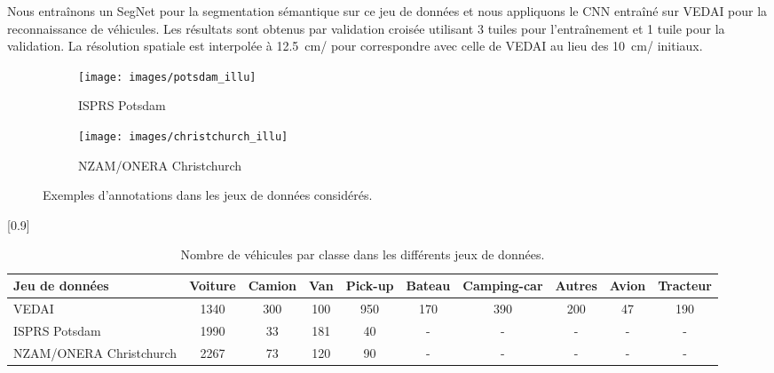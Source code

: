 Nous entraînons un SegNet pour la segmentation sémantique sur ce jeu de données et nous appliquons le \gls{CNN} entraîné sur \gls{VEDAI} pour la reconnaissance de véhicules. Les résultats sont obtenus par validation croisée utilisant 3 tuiles pour l'entraînement et 1 tuile pour la validation. La résolution spatiale est interpolée à \SI{12,5}{\centi\meter/\px} pour correspondre avec celle de \gls{VEDAI} au lieu des \SI{10}{\centi\meter/\px} initiaux.

\begin{figure}[t]
\centering
	\begin{subfigure}[]{0.45\textwidth}
    	\texttt{[image: images/potsdam\_illu]}
      \caption{ISPRS Potsdam}
    \end{subfigure}
    \begin{subfigure}[]{0.45\textwidth}
    	\texttt{[image: images/christchurch\_illu]}
      \caption{NZAM/ONERA Christchurch}
    \end{subfigure}
    \caption{Exemples d'annotations dans les jeux de données considérés.}
    \label{fig:datasets}
\end{figure}
\unskip
\begin{table}[t]
	\setlength\tabcolsep{2.5pt}
    \caption{Nombre de véhicules par classe dans les différents jeux de données.}
    \label{tab:vehicle_counts}
    \scalebox{0.9}[0.9]{
	\begin{tabularx}{1.1\textwidth}{Y c c c c c c c cc}
    \toprule
    \textbf{Jeu de données} & \textbf{Voiture} & \textbf{Camion} & \textbf{Van} & \textbf{Pick-up} & \textbf{Bateau} & \textbf{Camping-car} & \textbf{Autres} & \textbf{Avion} & \textbf{Tracteur}\\
    \midrule
    VEDAI & 1340 &  300 & 100 & 950 & 170 & 390 & 200 & 47 & 190\\
    ISPRS Potsdam & 1990 & 33 & 181 & 40 & - & - & - & - & -\\
    NZAM/ONERA Christchurch & 2267 & 73 & 120 & 90 & - & - & - & - & -\\
    \bottomrule
    \end{tabularx}}
\end{table}

